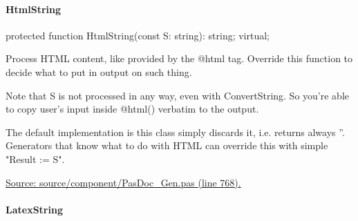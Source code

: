 \documentclass{report}
\newif\ifpdf
\begin{document}
\paragraph*{HtmlString}\hspace*{\fill}

\label{PasDoc_Gen.TDocGenerator-HtmlString}
\begin{list}{}{
\setlength{\itemindent}{0cm}
\setlength{\listparindent}{0cm}
\setlength{\leftmargin}{\evensidemargin}
\addtolength{\leftmargin}{\tmplength}
\settowidth{\labelsep}{X}
\addtolength{\leftmargin}{\labelsep}
\setlength{\labelwidth}{\tmplength}
}
\item[\textbf{Declaration}\hfill]
\ifpdf
\begin{flushleft}
\fi
\begin{ttfamily}
protected function HtmlString(const S: string): string; virtual;\end{ttfamily}

\ifpdf
\end{flushleft}
\fi

\par
\item[\textbf{Description}]
Process HTML content, like provided by the @html tag. Override this function to decide what to put in output on such thing.

Note that S is not processed in any way, even with ConvertString. So you're able to copy user's input inside @html() verbatim to the output.

The default implementation is this class simply discards it, i.e. returns always ''. Generators that know what to do with HTML can override this with simple "Result := S".\par
\href{https://github.com/pasdoc/pasdoc/blob/master/source/component/PasDoc_Gen.pas#L768}{Source: source/component/PasDoc{\_}Gen.pas (line 768).}

\end{list}
\paragraph*{LatexString}\hspace*{\fill}
\end{document}
